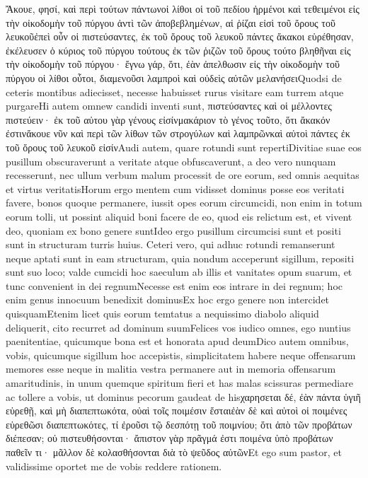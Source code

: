 Ἄκουε, φησί, καὶ περὶ τούτων πάντωνοἱ λίθοι οἱ τοῦ πεδίου ἠρμένοι καὶ τεθειμένοι εἰς τὴν οἰκοδομὴν τοῦ πύργου ἀντὶ τῶν ἀποβεβλημένων, αἱ ῥίζαι εἰσὶ τοῦ ὄρους τοῦ λευκοῦἐπεὶ οὖν οἱ πιστεύσαντες, ἐκ τοῦ ὄρους τοῦ λευκοῦ πάντες ἄκακοι εὑρέθησαν, ἐκέλευσεν ὁ κύριος τοῦ πύργου τούτους ἐκ τῶν ῥιζῶν τοῦ ὄρους τούτο βληθῆναι εἰς τὴν οἰκοδομὴν τοῦ πύργου· ἔγνω γάρ, ὅτι, ἐὰν ἀπελθωσιν εἰς τὴν οἰκοδομὴν τοῦ πύργου οἱ λίθοι οὗτοι, διαμενοῦσι λαμπροὶ καὶ οὐδεὶς αὐτῶν μελανήσειQuodsi de ceteris montibus adiecisset, necesse habuisset rurus visitare eam turrem atque purgareHi autem omnew candidi inventi sunt, πιστεύσαντες καὶ οἱ μέλλοντες πιστεύειν· ἐκ τοῦ αὐτου γὰρ γένους εἰσίνμακάριον τὸ γένος τοῦτο, ὅτι ἄκακόν ἐστινἄκουε νῦν καὶ περὶ τῶν λίθων τῶν στρογύλων καὶ λαμπρῶνκαὶ αὐτοὶ πάντες ἐκ τοῦ ὄρους τοῦ λευκοῦ εἰσίνAudi autem, quare rotundi sunt repertiDivitiae suae eos pusillum obscuraverunt a veritate atque obfuscaverunt, a deo vero nunquam recesserunt, nec ullum verbum malum processit de ore eorum, sed omnis aequitas et virtus veritatisHorum ergo mentem cum vidisset dominus posse eos veritati favere, bonos quoque permanere, iussit opes eorum circumcidi, non enim in totum eorum tolli, ut possint aliquid boni facere de eo, quod eis relictum est, et vivent deo, quoniam ex bono genere suntIdeo ergo pusillum circumcisi sunt et positi sunt in structuram turris huius.
Ceteri vero, qui adhuc rotundi remanserunt neque aptati sunt in eam structuram, quia nondum acceperunt sigillum, repositi sunt suo loco; valde cumcidi hoc saeculum ab illis et vanitates opum suarum, et tunc convenient in dei regnumNecesse est enim eos intrare in dei regnum; hoc enim genus innocuum benedixit dominusEx hoc ergo genere non intercidet quisquamEtenim licet quis eorum temtatus a nequissimo diabolo aliquid deliquerit, cito recurret ad dominum suumFelices vos iudico omnes, ego nuntius paenitentiae, quicumque bona est et honorata apud deumDico autem omnibus, vobis, quicumque sigillum hoc accepistis, simplicitatem habere neque offensarum memores esse neque in malitia vestra permanere aut in memoria offensarum amaritudinis, in unum quemque spiritum fieri et has malas scissuras permediare ac tollere a vobis, ut dominus pecorum gaudeat de hisχαρησεται δέ, ἐὰν πάντα ὑγιῆ εὑρεθῇ, καὶ μὴ διαπεπτωκότα, οὐαὶ τοῖς ποιμέσιν ἔσταιἐὰν δὲ καὶ αὐτοὶ οἱ ποιμένες εὑρεθῶσι διαπεπτωκότες, τί ἐροῦσι τῷ δεσπότῃ τοῦ ποιμνίου; ὅτι ἀπὸ τῶν προβάτων διέπεσαν; οὐ πιστευθήσονται· ἄπιστον γὰρ πρᾶγμά ἐστι ποιμένα ὑπὸ προβάτων παθεῖν τι· μᾶλλον δὲ κολασθήσονται διὰ τὸ ψεῦδος αὐτῶνEt ego sum pastor, et validissime oportet me de vobis reddere rationem.
